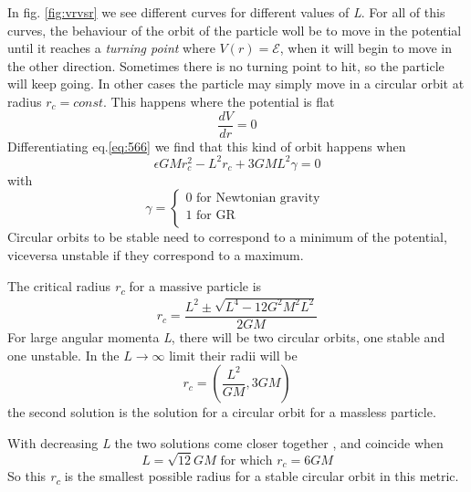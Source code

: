 In fig. \ref{fig:vrvsr} we see different curves for different values of \emph{L}. For all of this curves, the behaviour of the orbit of the particle woll be to move in the  potential until it reaches a \emph{turning point} where $V\left( r \right) = \mathcal{E}$, when it will begin to move in the other direction. Sometimes there is no turning point to hit, so the particle will keep going. In other cases the particle may simply  move in a circular orbit at radius $r_{c} = const$. This happens where the potential is flat
\[
\frac{d V}{d r} = 0
\]
Differentiating eq.\ref{eq:566} we find that this kind of orbit happens when
\[
\epsilon GM r_{c}^{2}- L^{2}r_{c} + 3GML^{2}\gamma  = 0
\]
with 
\[
\gamma = \begin{cases}
0 \text{ for Newtonian gravity } \\
1 \text{ for GR } \\
\end{cases}
\]
Circular orbits to be stable need to correspond to a minimum of the potential, viceversa unstable if they correspond to a maximum.\par
The critical radius \emph{r\textsubscript{c}} for a massive particle is
\begin{equation}
	r_{c} = \frac{L^{2} \pm \sqrt{ L^{4} - 12G^{2} M^{2}L^{2}}}{2GM}
\end{equation}
For large angular momenta \emph{L}, there will be two circular orbits, one stable and one unstable. In the $L \to  \infty$ limit their radii will be
\begin{equation}
r_{c} = \left( \frac{L^{2}}{GM}, 3GM \right)
\end{equation}
the second solution is the solution for a circular orbit for a massless particle.\par
With decreasing \emph{ L} the two solutions come closer together , and coincide when 
\[
	L = \sqrt{12}GM \text{ for which } r_{c} = 6GM
\]
So this \emph{r\textsubscript{c}} is the smallest possible radius for a stable circular orbit in this metric.

